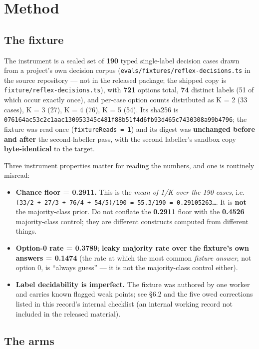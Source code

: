 \documentclass[11pt,a4paper]{article}
\begin{document}
\section{Method}

\subsection{The fixture}

The instrument is a sealed set of \textbf{190} typed single-label decision cases drawn from a project's own decision corpus (\texttt{evals/fixtures/reflex-decisions.ts} in the source repository --- not in the released package; the shipped copy is \texttt{fixture/reflex-decisions.ts}), with \textbf{721} options total, \textbf{74} distinct labels (51 of which occur exactly once), and per-case option counts distributed as K = 2 (33 cases), K = 3 (27), K = 4 (76), K = 5 (54). Its sha256 is \texttt{076164ac53c2c1aac130953345c481f88b51f4d6fb93d465c7430308a99b4796}; the fixture was read once (\texttt{fixtureReads = 1}) and its digest was \textbf{unchanged before and after} the second-labeller pass, with the second labeller's sandbox copy \textbf{byte-identical} to the target.

Three instrument properties matter for reading the numbers, and one is routinely misread:

\begin{itemize}
\item \textbf{Chance floor = 0.2911.} This is the \emph{mean of 1/K over the 190 cases}, i.e. \texttt{(33/2 + 27/3 + 76/4 + 54/5)/190 = 55.3/190 = 0.29105263\ldots{}}. It is \textbf{not} the majority-class prior. Do not conflate the \textbf{0.2911} floor with the \textbf{0.4526} majority-class control; they are different constructs computed from different things.
\item \textbf{Option-0 rate = 0.3789}; \textbf{leaky majority rate over the fixture's own answers = 0.1474} (the rate at which the most common \emph{fixture answer}, not option 0, is ``always guess'' --- it is not the majority-class control either).
\item \textbf{Label decidability is imperfect.} The fixture was authored by one worker and carries known flagged weak points; see \S6.2 and the five owed corrections listed in this record's internal checklist (an internal working record not included in the released material).
\end{itemize}

\subsection{The arms}
\end{document}
